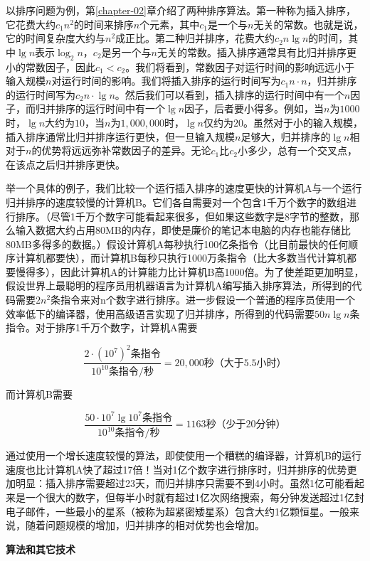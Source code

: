 \documentclass[lang=cn,newtx,10pt,scheme=chinese]{elegantbook}
\begin{document}
以排序问题为例，第\ref{chapter-02}章介绍了两种排序算法。第一种称为插入排序，它花费大约$c_1n^2$的时间来排序$n$个元素，其中$c_1$是一个与$n$无关的常数。也就是说，它的时间复杂度大约与$n^2$成正比。第二种归并排序，花费大约$c_2n\lg n$的时间，其中$\lg n$表示$\log_2n$，$c_2$是另一个与$n$无关的常数。插入排序通常具有比归并排序更小的常数因子，因此$c_1 < c_2$。我们将看到，常数因子对运行时间的影响远远小于输入规模$n$对运行时间的影响。我们将插入排序的运行时间写为$c_1n \cdot n$，归并排序的运行时间写为$c_2n \cdot \lg n$。然后我们可以看到，插入排序的运行时间中有一个$n$因子，而归并排序的运行时间中有一个$\lg n$因子，后者要小得多。例如，当$n$为$1000$时，$\lg n$大约为$10$，当$n$为$1,000,000$时，$\lg n$仅约为$20$。虽然对于小的输入规模，插入排序通常比归并排序运行更快，但一旦输入规模$n$足够大，归并排序的$\lg n$相对于$n$的优势将远远弥补常数因子的差异。无论$c_1$比$c_2$小多少，总有一个交叉点，在该点之后归并排序更快。

举一个具体的例子，我们比较一个运行插入排序的速度更快的计算机A与一个运行归并排序的速度较慢的计算机B。它们各自需要对一个包含1千万个数字的数组进行排序。（尽管1千万个数字可能看起来很多，但如果这些数字是8字节的整数，那么输入数据大约占用80MB的内存，即使是廉价的笔记本电脑的内存也能存储比80MB多得多的数据。）假设计算机A每秒执行100亿条指令（比目前最快的任何顺序计算机都要快），而计算机B每秒只执行1000万条指令（比大多数当代计算机都要慢得多），因此计算机A的计算能力比计算机B高1000倍。为了使差距更加明显，假设世界上最聪明的程序员用机器语言为计算机A编写插入排序算法，所得到的代码需要$2n^2$条指令来对n个数字进行排序。进一步假设一个普通的程序员使用一个效率低下的编译器，使用高级语言实现了归并排序，所得到的代码需要$50n\lg n$条指令。对于排序1千万个数字，计算机A需要

$$
\frac{2\cdot (10^7)^2\text{条指令}}{10^{10}\text{条指令}/\text{秒}}
=
20,000\text{秒（大于5.5小时）}
$$

而计算机B需要

$$
\frac{50\cdot 10^7\lg 10^7\text{条指令}}{10^{10}\text{条指令}/\text{秒}}
=
1163\text{秒（少于20分钟）}
$$

通过使用一个增长速度较慢的算法，即使使用一个糟糕的编译器，计算机B的运行速度也比计算机A快了超过17倍！当对1亿个数字进行排序时，归并排序的优势更加明显：插入排序需要超过23天，而归并排序只需要不到4小时。虽然1亿可能看起来是一个很大的数字，但每半小时就有超过1亿次网络搜索，每分钟发送超过1亿封电子邮件，一些最小的星系（被称为超紧密矮星系）包含大约1亿颗恒星。一般来说，随着问题规模的增加，归并排序的相对优势也会增加。

\textbf{算法和其它技术}
\end{document}
